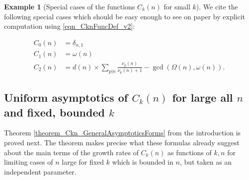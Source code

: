 \documentclass[11pt,reqno,a4letter]{article}
\numberwithin{figure}{section}
\numberwithin{table}{section}
\theoremstyle{plain}
\numberwithin{theorem}{section}
\theoremstyle{definition}
\newtheorem{example}[theorem]{Example}
\newcommand{\NBRef}[1]{}
\begin{document}
\begin{example}[Special cases of the functions $C_k(n)$ for small $k$] 
\label{example_SpCase_Ckn} 
We cite the following special cases which should be easy enough to see on paper by 
explicit computation using \eqref{eqn_CknFuncDef_v2}: 
\NBRef{A07-2020-04-26} 
\begin{align*} 
C_0(n) & = \delta_{n,1} \\ 
C_1(n) & = \omega(n) \\ 
C_2(n) & = d(n) \times \sum_{p|n} \frac{\nu_p(n)}{\nu_p(n)+1} - \gcd\left(\Omega(n), \omega(n)\right). 
\end{align*} 
\end{example} 

\subsection{Uniform asymptotics of $C_k(n)$ for large all $n$ and fixed, bounded $k$} 

Theorem \ref{theorem_Ckn_GeneralAsymptoticsForms} from the introduction is proved next. 
The theorem makes precise what these formulas already 
suggest about the main terms of the growth rates of 
$C_k(n)$ as functions of $k,n$ for limiting cases of $n$ large for fixed $k$ which is bounded in $n$, 
but taken as an independent parameter. 
\end{document}
